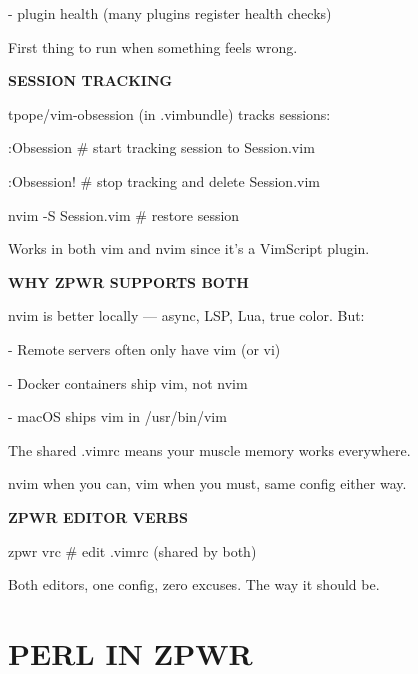\documentclass[11pt,a4paper,twoside]{book}
\begin{document}
- plugin health (many plugins register health checks)

First thing to run when something feels wrong.


\vspace{12pt}
{\bfseries\color{neonyellow} SESSION TRACKING}\vspace{4pt}

tpope/vim-obsession (in .vimbundle) tracks sessions:

:Obsession           \# start tracking session to Session.vim

:Obsession!          \# stop tracking and delete Session.vim

\begin{codebox}
nvim -S Session.vim  \# restore session\\
\end{codebox}

Works in both vim and nvim since it's a VimScript plugin.


\vspace{12pt}
{\bfseries\color{neonyellow} WHY ZPWR SUPPORTS BOTH}\vspace{4pt}

nvim is better locally — async, LSP, Lua, true color. But:

- Remote servers often only have vim (or vi)

- Docker containers ship vim, not nvim

- macOS ships vim in /usr/bin/vim

The shared .vimrc means your muscle memory works everywhere.

nvim when you can, vim when you must, same config either way.


\vspace{12pt}
{\bfseries\color{neonyellow} ZPWR EDITOR VERBS}\vspace{4pt}

\begin{codebox}
zpwr vrc             \# edit .vimrc (shared by both)\\
\end{codebox}

Both editors, one config, zero excuses. The way it should be.


\vspace{16pt}


\chapter{PERL IN ZPWR}
\end{document}
